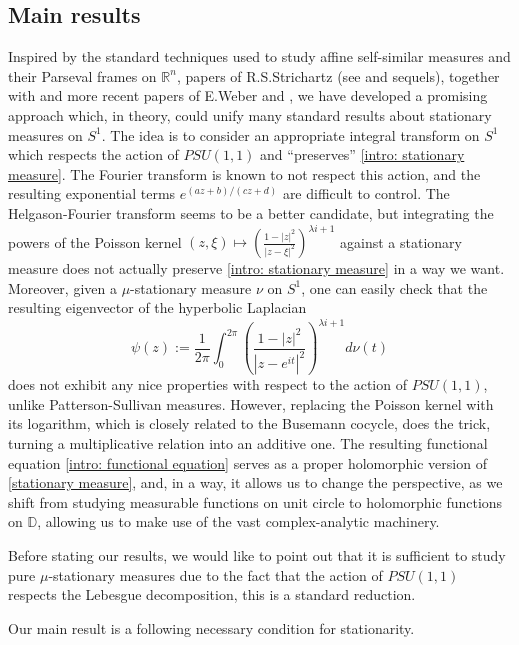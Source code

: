 \documentclass[11pt]{article}
\begin{document}
\subsection{Main results}
Inspired by the standard techniques used to study affine self-similar measures and their Parseval frames on $\mathbb{R}^n$, papers of R.S.Strichartz (see \cite{strichartzI} and sequels), together with \cite{denseanalytic} and more recent papers of E.Weber \cite{weber2017paleywiener} and \cite{axioms6020007}, we have developed a promising approach which, in theory, could unify many standard results about stationary measures on $S^1$. The idea is to consider an appropriate integral transform on $S^1$ which respects the action of $PSU(1,1)$ and ``preserves'' \eqref{intro: stationary measure}. The Fourier transform is known to not respect this action, and the resulting exponential terms $e^{(az +b) / (cz+d)}$ are difficult to control. The Helgason-Fourier transform seems to be a better candidate, but integrating the powers of the Poisson kernel $(z, \xi) \mapsto \left( \frac{1 - |z|^2}{|z - \xi|^2}\right)^{\lambda i + 1}$ against a stationary measure does not actually preserve \eqref{intro: stationary measure} in a way we want. Moreover, given a $\mu$-stationary measure $\nu$ on $S^1$, one can easily check that the resulting eigenvector of the hyperbolic Laplacian
\[
\psi(z) := \frac{1}{2\pi} \int_{0}^{2\pi} \left( \frac{1 - |z|^2}{|z - e^{i t}|^2}\right)^{\lambda i + 1} d\nu(t)
\]
does not exhibit any nice properties with respect to the action of $PSU(1,1)$, unlike Patterson-Sullivan measures. However, replacing the Poisson kernel with its logarithm, which is closely related to the Busemann cocycle, does the trick, turning a multiplicative relation into an additive one. The resulting functional equation \eqref{intro: functional equation} serves as a proper holomorphic version of \eqref{stationary measure}, and, in a way, it allows us to change the perspective, as we shift from studying measurable functions on unit circle to holomorphic functions on $\mathbb{D}$, allowing us to make use of the vast complex-analytic machinery.

Before stating our results, we would like to point out that it is sufficient to study pure $\mu$-stationary measures due to the fact that the action of $PSU(1,1)$ respects the Lebesgue decomposition, this is a standard reduction.

Our main result is a following necessary condition for stationarity.
\end{document}
